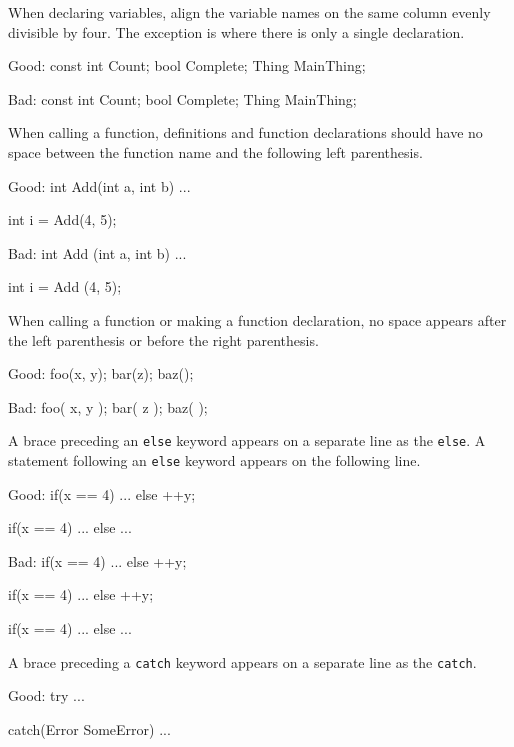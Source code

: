 \item
When declaring variables, align the variable names on the same column evenly divisible by four. The exception is where there is only a single declaration.

Good:
\startCodeExample
const int   Count;
bool        Complete;
Thing       MainThing;
\stopCodeExample

Bad:
\startCodeExample
const int Count;
bool Complete;
Thing MainThing;
\stopCodeExample

\item
When calling a function, definitions and function declarations should have no space between the function name and the following left parenthesis.

Good:
\startCodeExample
int Add(int a, int b)
{ 
    ... 
}

int i = Add(4, 5);
\stopCodeExample

Bad:
\startCodeExample
int Add (int a, int b)
{
    ...
}

int i = Add (4, 5);
\stopCodeExample

\item
When calling a function or making a function declaration, no space appears after the left parenthesis or before the right parenthesis.

Good:
\startCodeExample
foo(x, y);
bar(z);
baz();
\stopCodeExample

Bad:
\startCodeExample
foo( x, y );
bar( z );
baz( );
\stopCodeExample

\item
A brace preceding an {\tt else} keyword appears on a separate line as the {\tt else}. A statement following an {\tt else} keyword appears on the following line. 

Good:
\startCodeExample
if(x == 4)
{
    ...
}
else
  ++y;

if(x == 4)
{
    ...
}
else
{
    ...
}
\stopCodeExample

Bad:
\startCodeExample
if(x == 4) {
    ...
}
else ++y;

if(x == 4) {
    ...
} else ++y;

if(x == 4) {
    ...
}
else {
    ...
}
\stopCodeExample

\item
A brace preceding a {\tt catch} keyword appears on a separate line as the {\tt catch}. 

Good:
\startCodeExample
try
{
    ...
}

catch(Error SomeError)
{
    ...
}
\stopCodeExample

